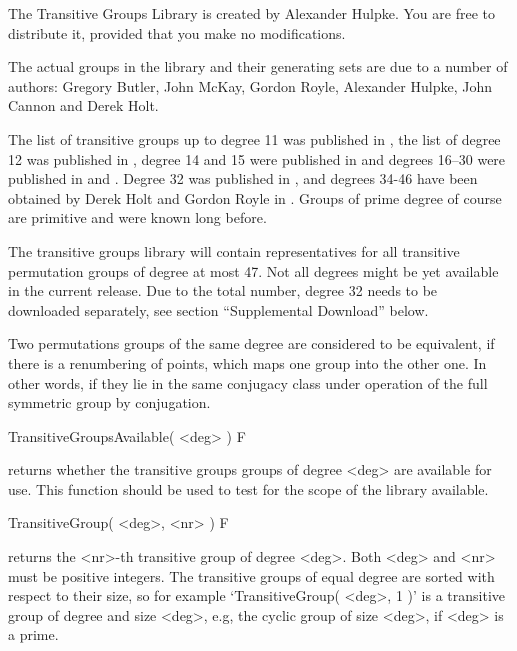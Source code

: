
The Transitive Groups Library is created by Alexander Hulpke.
You are free to distribute it, provided that you make no modifications.

The actual groups in the library and their generating sets are due to a
number of authors:
Gregory Butler, John McKay, Gordon
Royle, Alexander Hulpke, John Cannon and Derek Holt. 

The list of transitive  groups up  to degree 11
was published in \cite{BM83},  the list of degree  12 was published in
\cite{Roy87}, degree 14 and  15 were published in  \cite{Butler93} and
degrees 16--30 were published in \cite{Hulpke96} and \cite{HulpkeTG}.
Degree 32 was published in \cite{CanHolt32}, and degrees 34-46 have been
obtained by Derek Holt and Gordon Royle in \cite{HoltRoyle47}.
Groups of prime degree of course are primitive and were known long before.

The transitive groups library will contain representatives for all
transitive permutation groups of degree at most  47. Not all degrees might
be yet available in the current release. Due to the total number,
degree 32 needs to be downloaded separately, see section ``Supplemental
Download'' below.

Two permutations groups of the same degree are considered to be
equivalent, if there is a renumbering of points, which maps one group into
the other one.
In other words, if they lie in the same conjugacy class under operation
of the full symmetric group by conjugation.


\>TransitiveGroupsAvailable( <deg> ) F

returns whether the transitive groups groups of degree <deg> are available
for use. This function should be used to test for the scope of the library
available.

\>TransitiveGroup( <deg>, <nr> ) F

returns the <nr>-th transitive  group of degree <deg>.  Both  <deg> and
<nr> must be  positive integers. The transitive groups of equal  degree
are  sorted with  respect to   their  size, so for  example
`TransitiveGroup(  <deg>, 1 )' is a  transitive group  of degree and
size <deg>, e.g, the cyclic  group  of size <deg>,   if <deg> is a
prime.

